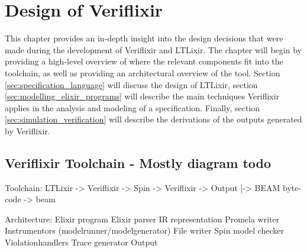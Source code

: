 \chapter{Design of Veriflixir}
This chapter provides an in-depth insight into the design decisions that were made during the development of Veriflixir and LTLixir. The chapter will begin by providing a high-level overview of where the relevant components fit into the toolchain, as well as providing an architectural overview of the tool. Section \ref{sec:specification_language} will discuss the design of LTLixir, section \ref{sec:modelling_elixir_programs} will describe the main techniques Veriflixir applies in the analysis and modeling of a specification. Finally, section \ref{sec:simulation_verification} will describe the derivations of the outputs generated by Veriflixir.  
\section{Veriflixir Toolchain - Mostly diagram todo} \label{sec:toolchain}
Toolchain:
LTLixir -> Veriflixir -> Spin -> Veriflixir -> Output
|-> BEAM byte-code -> beam 

Architecture:
Elixir program
Elixir parser
IR representation
Promela writer
Instrumentors (modelrunner/modelgenerator)
File writer
Spin model checker
Violationhandlers
Trace generator
Output

